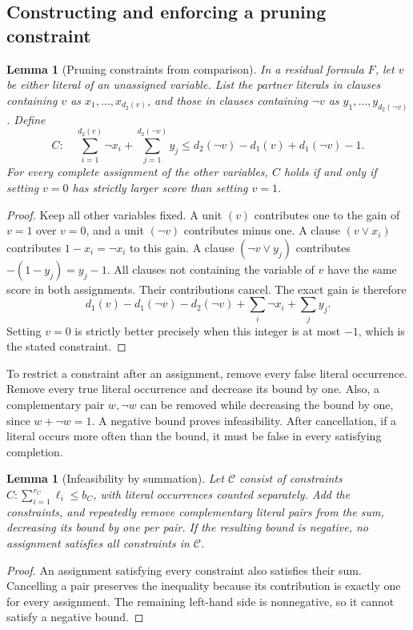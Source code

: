 \documentclass[11pt,a4paper]{article}
\newtheorem{lemma}[theorem]{Lemma}
\theoremstyle{definition}
\theoremstyle{remark}
\begin{document}
\subsection{Constructing and enforcing a pruning constraint}

\begin{lemma}[Pruning constraints from comparison]\label{lem:pruning}
In a residual formula $F$, let $v$ be either literal of an unassigned
variable. List the partner literals in clauses containing $v$ as
$x_1,\ldots,x_{d_2(v)}$, and those in clauses containing $\neg v$ as
$y_1,\ldots,y_{d_2(\neg v)}$. Define
\begin{equation}
 C:\quad \sum_{i=1}^{d_2(v)}\neg x_i+
             \sum_{j=1}^{d_2(\neg v)}y_j
       \le d_2(\neg v)-d_1(v)+d_1(\neg v)-1.
 \label{eq:gap_pruning}
\end{equation}
For every complete assignment of the other variables, $C$ holds if and
only if setting $v=0$ has strictly larger score than setting $v=1$.
\end{lemma}
\begin{proof}
Keep all other variables fixed. A unit $(v)$ contributes one to the gain
of $v=1$ over $v=0$, and a unit $(\neg v)$ contributes minus one.
A clause $(v\vee x_i)$ contributes $1-x_i=\neg x_i$ to this gain.
A clause $(\neg v\vee y_j)$ contributes $-(1-y_j)=y_j-1$.
All clauses not containing the variable of $v$ have the same score in both
assignments. Their contributions cancel. The exact gain is therefore
\[
 d_1(v)-d_1(\neg v)-d_2(\neg v)
       +\sum_i\neg x_i+\sum_j y_j.
\]
Setting $v=0$ is strictly better precisely when this integer is at most
$-1$, which is the stated constraint.
\end{proof}

To restrict a constraint after an assignment, remove every false literal
occurrence. Remove every true literal occurrence and decrease its bound by
one. Also, a complementary pair $w,\neg w$ can be removed while decreasing
the bound by one, since $w+\neg w=1$. A negative bound proves infeasibility.
After cancellation, if a literal occurs more often than the bound, it must
be false in every satisfying completion.

\begin{lemma}[Infeasibility by summation]\label{lem:constraint_sum}
Let $\mathcal C$ consist of constraints $C:\sum_{i=1}^{r_C}\ell_i\le b_C$,
with literal occurrences counted separately. Add the constraints, and
repeatedly remove complementary literal pairs from the sum, decreasing
its bound by one per pair. If the resulting bound is negative, no
assignment satisfies all constraints in $\mathcal C$.
\end{lemma}
\begin{proof}
An assignment satisfying every constraint also satisfies their sum.
Cancelling a pair preserves the inequality because its contribution is
exactly one for every assignment. The remaining left-hand side is
nonnegative, so it cannot satisfy a negative bound.
\end{proof}
\end{document}
